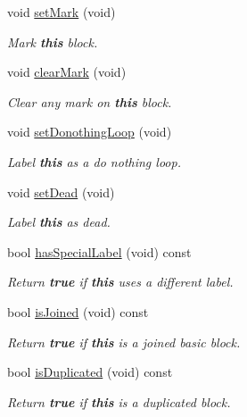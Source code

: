 \begin{DoxyCompactItemize}
void \mbox{\hyperlink{class_flow_block_a3a64aa8a8182a65f5e1e361d23ecc3c8}{set\+Mark}} (void)
\begin{DoxyCompactList}\small\item\em Mark {\bfseries{this}} block. \end{DoxyCompactList}\item 
void \mbox{\hyperlink{class_flow_block_ad8fe7973ef5e53753ea0695ea2d3b7be}{clear\+Mark}} (void)
\begin{DoxyCompactList}\small\item\em Clear any mark on {\bfseries{this}} block. \end{DoxyCompactList}\item 
void \mbox{\hyperlink{class_flow_block_abab69fbbe915213e4164f2d2af788935}{set\+Donothing\+Loop}} (void)
\begin{DoxyCompactList}\small\item\em Label {\bfseries{this}} as a {\itshape do} {\itshape nothing} loop. \end{DoxyCompactList}\item 
void \mbox{\hyperlink{class_flow_block_a782f5f62072869fd9f093e7c58567a00}{set\+Dead}} (void)
\begin{DoxyCompactList}\small\item\em Label {\bfseries{this}} as dead. \end{DoxyCompactList}\item 
bool \mbox{\hyperlink{class_flow_block_a801de91f99947e442bc2b5378be21452}{has\+Special\+Label}} (void) const
\begin{DoxyCompactList}\small\item\em Return {\bfseries{true}} if {\bfseries{this}} uses a different label. \end{DoxyCompactList}\item 
bool \mbox{\hyperlink{class_flow_block_a45bcc5e1fc638ad05984b64d874e8859}{is\+Joined}} (void) const
\begin{DoxyCompactList}\small\item\em Return {\bfseries{true}} if {\bfseries{this}} is a {\itshape joined} basic block. \end{DoxyCompactList}\item 
bool \mbox{\hyperlink{class_flow_block_a62d5d1a34bb6725a102a58f937c54930}{is\+Duplicated}} (void) const
\begin{DoxyCompactList}\small\item\em Return {\bfseries{true}} if {\bfseries{this}} is a {\itshape duplicated} block. \end{DoxyCompactList}\item 

\end{DoxyCompactItemize}

